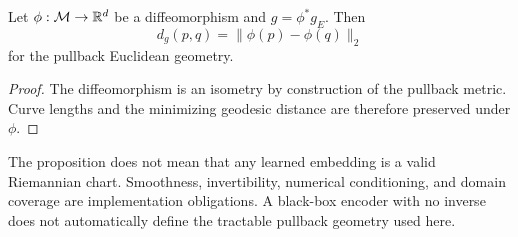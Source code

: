 \begin{proposition}
Let $\phi:\mathcal{M}\rightarrow\mathbb{R}^d$ be a diffeomorphism and $g=\phi^*g_E$. Then
\begin{equation}
  d_g(p,q)=\|\phi(p)-\phi(q)\|_2
\end{equation}
for the pullback Euclidean geometry.
\end{proposition}
\begin{proof}
The diffeomorphism is an isometry by construction of the pullback metric. Curve lengths and the minimizing geodesic distance are therefore preserved under $\phi$.
\end{proof}

\begin{remark}
The proposition does not mean that any learned embedding is a valid Riemannian chart. Smoothness, invertibility, numerical conditioning, and domain coverage are implementation obligations. A black-box encoder with no inverse does not automatically define the tractable pullback geometry used here.
\end{remark}


